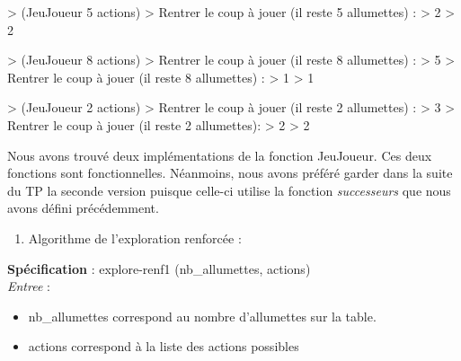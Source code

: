 \documentclass[
]{article}
\newenvironment{Shaded}{}{}
\newcommand{\DecValTok}[1]{\textcolor[rgb]{0.25,0.63,0.44}{#1}}
\newcommand{\NormalTok}[1]{#1}
\newcommand{\OperatorTok}[1]{\textcolor[rgb]{0.40,0.40,0.40}{#1}}
\providecommand{\tightlist}{%
  \setlength{\itemsep}{0pt}\setlength{\parskip}{0pt}}
\begin{document}
\begin{Shaded}
    \begin{algorithm}[H]
\begin{Highlighting}[]
\OperatorTok{\textgreater{}}\NormalTok{ (JeuJoueur }\DecValTok{5}\NormalTok{ actions)}
\OperatorTok{\textgreater{}}\NormalTok{ Rentrer le coup à jouer (il reste }\DecValTok{5}\NormalTok{ allumettes) :}
\OperatorTok{\textgreater{}} \DecValTok{2}
\OperatorTok{\textgreater{}} \DecValTok{2}

\OperatorTok{\textgreater{}}\NormalTok{ (JeuJoueur }\DecValTok{8}\NormalTok{ actions)}
\OperatorTok{\textgreater{}}\NormalTok{ Rentrer le coup à jouer (il reste }\DecValTok{8}\NormalTok{ allumettes) :}
\OperatorTok{\textgreater{}} \DecValTok{5}
\OperatorTok{\textgreater{}}\NormalTok{ Rentrer le coup à jouer (il reste }\DecValTok{8}\NormalTok{ allumettes) :}
\OperatorTok{\textgreater{}} \DecValTok{1}
\OperatorTok{\textgreater{}} \DecValTok{1}

\OperatorTok{\textgreater{}}\NormalTok{ (JeuJoueur }\DecValTok{2}\NormalTok{ actions)}
\OperatorTok{\textgreater{}}\NormalTok{ Rentrer le coup à jouer (il reste }\DecValTok{2}\NormalTok{ allumettes) :}
\OperatorTok{\textgreater{}} \DecValTok{3}
\OperatorTok{\textgreater{}}\NormalTok{ Rentrer le coup à jouer (il reste }\DecValTok{2}\NormalTok{ allumettes):}
\OperatorTok{\textgreater{}} \DecValTok{2}
\OperatorTok{\textgreater{}} \DecValTok{2}
\end{Highlighting}
\end{algorithm}
\end{Shaded}

Nous avons trouvé deux implémentations de la fonction JeuJoueur. Ces
deux fonctions sont fonctionnelles. Néanmoins, nous avons préféré garder
dans la suite du TP la seconde version puisque celle-ci utilise la
fonction \emph{successeurs} que nous avons défini précédemment.

\pagebreak

\begin{enumerate}
\def\labelenumi{\arabic{enumi}.}
\setcounter{enumi}{2}
\tightlist
\item
  Algorithme de l'exploration renforcée :
\end{enumerate}

\textbf{Spécification} : explore-renf1 (nb\_allumettes, actions)\\
\emph{Entree} :
\begin{itemize}
\item nb\_allumettes correspond au nombre d'allumettes sur la table.
\item actions correspond à la liste des actions possibles
\end{itemize}
\end{document}
